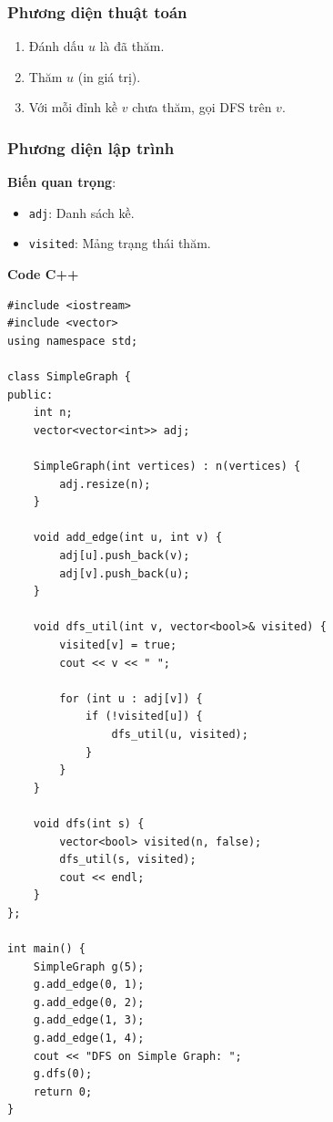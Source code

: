 \documentclass[a4paper,12pt]{article}
\begin{document}
\subsubsection{Phương diện thuật toán}
\begin{enumerate}
    \item Đánh dấu \( u \) là đã thăm.
    \item Thăm \( u \) (in giá trị).
    \item Với mỗi đỉnh kề \( v \) chưa thăm, gọi DFS trên \( v \).
\end{enumerate}

\subsubsection{Phương diện lập trình}
\textbf{Biến quan trọng}:
\begin{itemize}
    \item \texttt{adj}: Danh sách kề.
    \item \texttt{visited}: Mảng trạng thái thăm.
\end{itemize}

\textbf{Code C++}
\lstset{language=C++}
\begin{lstlisting}
#include <iostream>
#include <vector>
using namespace std;

class SimpleGraph {
public:
    int n;
    vector<vector<int>> adj;

    SimpleGraph(int vertices) : n(vertices) {
        adj.resize(n);
    }

    void add_edge(int u, int v) {
        adj[u].push_back(v);
        adj[v].push_back(u);
    }

    void dfs_util(int v, vector<bool>& visited) {
        visited[v] = true;
        cout << v << " ";

        for (int u : adj[v]) {
            if (!visited[u]) {
                dfs_util(u, visited);
            }
        }
    }

    void dfs(int s) {
        vector<bool> visited(n, false);
        dfs_util(s, visited);
        cout << endl;
    }
};

int main() {
    SimpleGraph g(5);
    g.add_edge(0, 1);
    g.add_edge(0, 2);
    g.add_edge(1, 3);
    g.add_edge(1, 4);
    cout << "DFS on Simple Graph: ";
    g.dfs(0);
    return 0;
}
\end{lstlisting}
\end{document}

